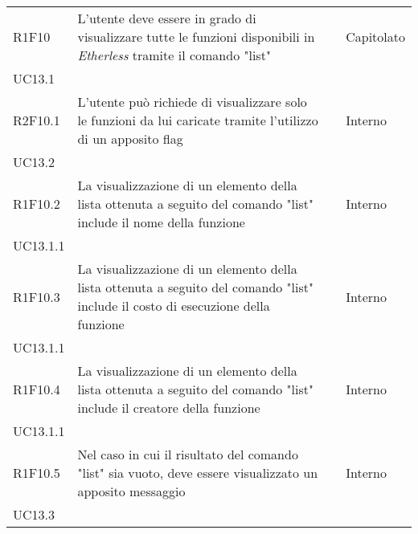 \begin{longtable}{ 
		>{\centering}p{} 
		>{}p{} 
		>{\centering}p{}
		>{\centering}p{} }
	R1F10 & L'utente deve essere in grado di visualizzare tutte le funzioni 
		disponibili in \textit{Etherless} tramite il comando "list" 				& \ob & Capitolato \\ UC13.1 \tabularnewline
	R2F10.1 & L'utente può richiede di visualizzare solo le funzioni da 
		lui caricate tramite l'utilizzo di un apposito flag 						& \ob & Interno \\ UC13.2 \tabularnewline
	R1F10.2 & La visualizzazione di un elemento della lista ottenuta a seguito 
		del comando "list" include il nome della funzione 							& \ob & Interno \\ UC13.1.1 \tabularnewline
	R1F10.3 & La visualizzazione di un elemento della lista ottenuta a seguito 
		del comando "list" include il costo di esecuzione della funzione 			& \ob & Interno \\ UC13.1.1 \tabularnewline
	R1F10.4 & La visualizzazione di un elemento della lista ottenuta a seguito 
		del comando "list" include il creatore della funzione 						& \ob & Interno \\ UC13.1.1 \tabularnewline
	R1F10.5 & Nel caso in cui il risultato del comando "list" sia vuoto, deve 
		essere visualizzato un apposito messaggio 									& \ob & Interno \\ UC13.3 \tabularnewline
	

\end{longtable}
